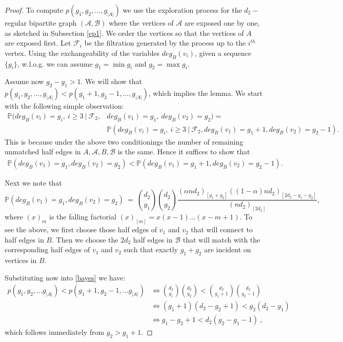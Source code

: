\documentclass[11pt,reqno]{amsart}
\begin{document}
\begin{proof} To compute $p(g_1,g_2,\ldots, g_{|A|})$ we use the exploration process for the $d_2-$regular bipartite graph $(\mathcal{A},\mathcal{B})$  where the vertices of $\mathcal{A}$ are exposed  one by one, as sketched in Subsection \ref{ep1}. We order the vertices so that the vertices of $A$ are exposed first. Let $\mathcal{F}_i$ be the filtration generated by the process up to the $i^{th}$ vertex.
Using the exchangeability of the variables $deg_{B}(v_i)$, given a
sequence $\{g_i\}$, w.l.o.g. we can assume $g_1=\min g_i$ and
$g_2=\max g_i$. 

Assume now $g_2-g_1>1$. We will show that $p(g_1,g_2,\ldots,
g_{|A|})<p(g_1+1,g_2-1,\ldots, g_{|A|})$, which implies the lemma. 
We start with the following simple observation:
\begin{align*}
\mathbb{P}(deg_B(v_i)=g_i,~i\geq3 ~ \big | ~\mathcal{F}_2, & deg_B(v_1)=g_1,~deg_B(v_2)=g_2) =\\ 
& \mathbb{P}(deg_B(v_i)=g_i,~i\geq3 ~ \big | ~\mathcal{F}_2, deg_B(v_1)=g_1+1,deg_B(v_2)=g_2-1).
\end{align*}
This is because under the above two conditionings the number of
remaining unmatched half edges in $A,\mathcal{A},B,\mathcal{B}$ is the same. 
Hence it suffices to show that 
\begin{align}\label{bayes}
\mathbb{P}(deg_B(v_1)=g_1, deg_B(v_2)=g_2)< \mathbb{P}(deg_B(v_1)=g_1+1, deg_B(v_2)=g_2-1).
\end{align}

Next we note that
\[
\mathbb{P}(deg_B(v_1)=g_1, deg_B(v_2)=g_2)~=~\binom{d_2}{g_1}\binom{d_2}{g_2}\frac{(\alpha nd_2)_{[g_1+g_2]}((1-\alpha)nd_2)_{[2d_2-g_1-g_2]}}{(nd_2)_{[2d_2]}},
\]
where $(x)_m$ is the falling factorial
$(x)_{[m]}=x(x-1)\ldots(x-m+1)$. To see the above, we first choose
those half edges of $v_1$ and $v_2$ that will connect to half edges in
$B$. Then we choose the $2d_2$ half edges in $\mathcal{B}$ that will
match with the corresponding half edges of $v_1$ and $v_2$ such that
exactly $g_1+g_2$ are incident on vertices in $B$. 

Substituting now into \eqref{bayes} we have:
\begin{align*}
p(g_1,g_2,...g_{|A|})< p(g_1+1,g_2-1,...g_{|A|}) &\Longleftrightarrow
\binom{d_2}{g_1}\binom{d_2}{g_2}< \binom{d_2}{g_1+1}\binom{d_2}{g_2-1}\\
& \Longleftrightarrow
(g_1+1)(d_2-g_2+1)< g_2(d_2-g_1)\\
& \Longleftrightarrow g_1-g_2+1<d_2(g_2-g_1-1)~,
\end{align*}
which follows immediately from $g_2>g_1+1$.
\end{proof}
\noindent
\end{document}
